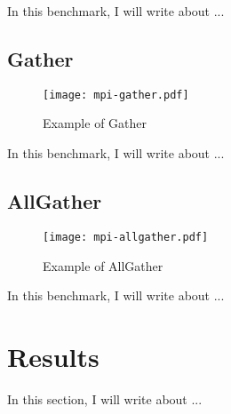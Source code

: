             In this benchmark, I will write about ...

        \subsection*{Gather}

            \begin{figure}[!tb]
                \centering%
                \caption{Example of \mpi Gather}%
                \label{fig:software-stack}%
                \texttt{[image: mpi-gather.pdf]}%
            \end{figure}

            In this benchmark, I will write about ...

        \subsection*{AllGather}

            \begin{figure}[!tb]
                \centering%
                \caption{Example of \mpi AllGather}%
                \label{fig:software-stack}%
                \texttt{[image: mpi-allgather.pdf]}%
            \end{figure}

            In this benchmark, I will write about ...

    \section{Results}

        In this section, I will write about ...